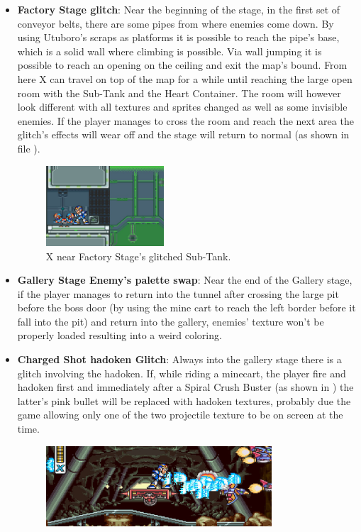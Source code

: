 \begin{itemize}
	\item \textbf{Factory Stage glitch}: Near the beginning of the stage,  in the first set of conveyor belts, there are some pipes from where enemies come down. By using Utuboro's scraps as platforms it is possible to reach the pipe's base, which is a solid wall where climbing is possible. Via wall jumping it is possible to reach an opening on the ceiling and exit the map's bound. From here X can travel on top of the map for a while until reaching the large open room with the Sub-Tank and the Heart Container. The room will however look different with all textures and sprites changed as well as some invisible enemies. If the player manages to cross the room and reach the next area the glitch's effects will wear off and the stage will return to normal (as shown in file ).
	\begin{figure}[htp]
		\centering
		\includegraphics[height=3cm]{figures/X1/Miscs/Factory_glitch_heart.jpg}
		\caption{X near Factory Stage's glitched Sub-Tank.}
	\end{figure}
	\item \textbf{Gallery Stage Enemy's palette swap}: Near the end of the Gallery stage, if the player manages to return into the tunnel after crossing the large pit before the boss door (by using the mine cart to reach the left border before it fall into the pit) and return into the gallery, enemies' texture won't be properly loaded resulting into a weird coloring.
	\item \textbf{Charged Shot hadoken Glitch}: Always into the gallery stage there is a glitch involving the hadoken. If, while riding a minecart, the player fire and hadoken first and immediately after a Spiral Crush Buster (as shown in ) the latter's pink bullet will be replaced with hadoken textures, probably due the game allowing only one of the two projectile texture to be on screen at the time.
	\begin{figure}[htp]
		\centering
		\includegraphics[height=3cm]{figures/X1/Miscs/Charged_hadoken_glitch.jpg}

\end{figure}
\end{itemize}
